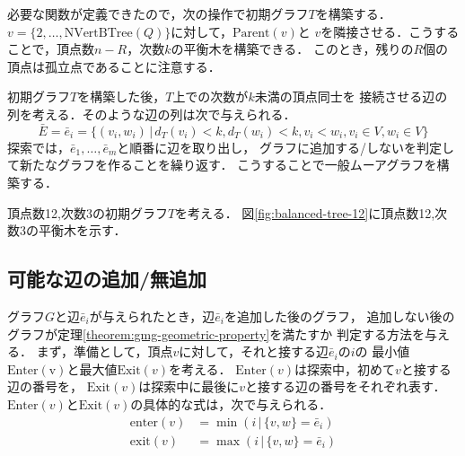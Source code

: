 必要な関数が定義できたので，次の操作で初期グラフ$T$を構築する．
$v=\{2,\ldots,\mathrm{NVertBTree}(Q)\}$に対して，$\mathrm{Parent}(v)$と
$v$を隣接させる．こうすることで，頂点数$n-R$，次数$k$の平衡木を構築できる．
このとき，残りの$R$個の頂点は孤立点であることに注意する．

初期グラフ$T$を構築した後，$T$上での次数が$k$未満の頂点同士を
接続させる辺の列を考える．そのような辺の列は次で与えられる．
\[ \bar{E} = \bar{e}_i = \{(v_i,w_i)\,|
\,d_T(v_i)<k,d_T(w_i)<k,v_i<w_i,v_i\in V,w_i\in V\} \]
探索では，$\bar{e}_1,\ldots,\bar{e}_m$と順番に辺を取り出し，
グラフに追加する/しないを判定して新たなグラフを作ることを繰り返す．
こうすることで一般ムーアグラフを構築する．

\begin{example}
  頂点数12,次数3の初期グラフ$T$を考える．
  図\ref{fig:balanced-tree-12}に頂点数12,次数3の平衡木を示す．
\end{example}

\subsection{可能な辺の追加/無追加}
\label{subsect:feasible-edge-(no)-addition}
グラフ$G$と辺$\bar{e}_i$が与えられたとき，辺$\bar{e}_i$を追加した後のグラフ，
追加しない後のグラフが定理\ref{theorem:gmg-geometric-property}を満たすか
判定する方法を与える．
まず，準備として，頂点$v$に対して，それと接する辺$\bar{e}_i$の$i$の
最小値$\mathrm{Enter(v)}$と最大値$\mathrm{Exit}(v)$を考える．
$\mathrm{Enter}(v)$は探索中，初めて$v$と接する辺の番号を，
$\mathrm{Exit}(v)$は探索中に最後に$v$と接する辺の番号をそれぞれ表す．
$\mathrm{Enter}(v)$と$\mathrm{Exit}(v)$の具体的な式は，次で与えられる．
\begin{align*}
  \mathrm{enter}(v) &= \min(i\,|\,\{v,w\}=\bar{e}_i) \\
  \mathrm{exit}(v) &= \max(i\,|\,\{v,w\}=\bar{e}_i)
\end{align*}

